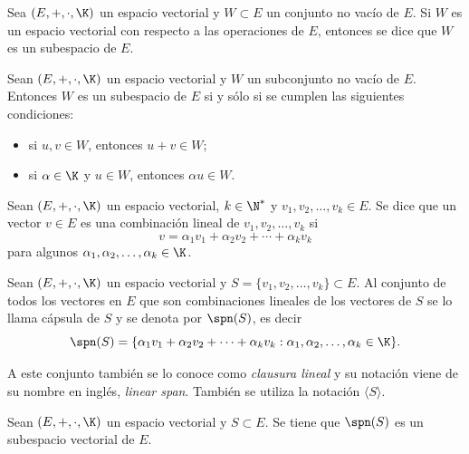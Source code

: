 \documentclass[a4,11pt]{aleph-notas}
\begin{document}
\begin{defi}
    Sea $(E,+,\cdot,\K)$ un espacio vectorial y $W \subset E$ un conjunto no vacío de $E$. Si $W$ es un espacio vectorial con respecto a las operaciones de $E$, entonces se dice que $W$ es un subespacio de $E$.
\end{defi}

\begin{teo}
    Sean $(E,+,\cdot,\K)$ un espacio vectorial y $W$ un subconjunto no vacío de $E$. Entonces $W$ es un subespacio de $E$ si y sólo si se cumplen las siguientes condiciones:
    \begin{itemize}
    \item 
        si $u,v \in W$, entonces $u + v \in W$;
    \item 
        si $\alpha \in \K$ y $u \in W$, entonces $\alpha u \in W$.
    \end{itemize}
\end{teo}

\begin{defi}
    Sean $(E,+,\cdot,\K)$ un espacio vectorial, $k\in\N^*$ y $v_1, v_2, \ldots, v_k \in E$. Se dice que un vector $v \in E$ es una combinación lineal de 
    $v_1, v_2, \ldots, v_k$ si 
    \[
        v = \alpha_1 v_1 + \alpha_2 v_2 + \cdots + \alpha_k v_k
    \]
    para algunos $\alpha_1, \alpha_2, \ldots, \alpha_k \in \K$.
\end{defi}

\begin{defi}
    Sean $(E,+,\cdot,\K)$ un espacio vectorial y $S = \{v_1, v_2, \ldots, v_k\} \subset E$. Al conjunto de todos los vectores en $E$ que son combinaciones lineales de los vectores de $S$ se lo llama cápsula de $S$ y se denota por $\spn(S)$, es decir
    \[
        \spn(S) = \{\alpha_1 v_1 + \alpha_2 v_2 + \cdots + \alpha_k v_k:\alpha_1, \alpha_2, \ldots, \alpha_k \in \K\}.
    \]
\end{defi}

\begin{advertencia}
    A este conjunto también se lo conoce como \emph{clausura lineal} y su notación viene de su nombre en inglés, \emph{linear span}. También se utiliza la notación $\langle S\rangle$.
\end{advertencia}

\begin{teo}
   Sean $(E,+,\cdot,\K)$ un espacio vectorial y $S\subset E$. Se tiene que $\spn(S)$ es un subespacio vectorial de $E$.
\end{teo}
\end{document}
